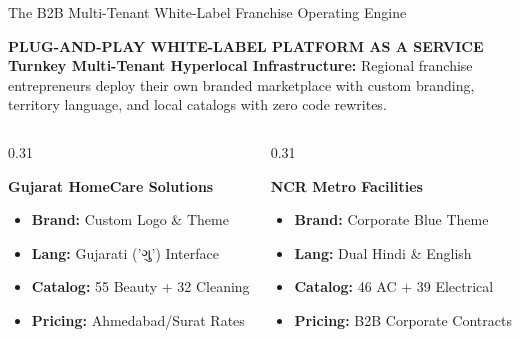 \documentclass[aspectratio=169,11pt]{beamer}
\begin{document}
\begin{frame}{The B2B Multi-Tenant White-Label Franchise Operating Engine}
\begin{tcolorbox}[colback=white,colframe=SmartGold,arc=3mm]
  {\scriptsize \textbf{\color{SmartGold}PLUG-AND-PLAY WHITE-LABEL PLATFORM AS A SERVICE}}\\[0.1cm]
  {\small \textbf{\color{SmartGreen}Turnkey Multi-Tenant Hyperlocal Infrastructure:}}
  {\scriptsize Regional franchise entrepreneurs deploy their own branded marketplace with custom branding, territory language, and local catalogs with zero code rewrites.}
\end{tcolorbox}
\vspace{0.2cm}
\begin{columns}[T]
  \begin{column}{0.31\textwidth}
    \begin{tcolorbox}[colback=white,colframe=SmartGreen,arc=3mm,title=\textbf{\tiny FRANCHISE A: GUJARAT CLUSTER}]
      {\tiny \textbf{Gujarat HomeCare Solutions}}
      \begin{itemize}\setlength\itemsep{0.15em}
        \item \textbf{\tiny Brand:} Custom Logo \& Theme
        \item \textbf{\tiny Lang:} Gujarati ('ગુ') Interface
        \item \textbf{\tiny Catalog:} 55 Beauty + 32 Cleaning
        \item \textbf{\tiny Pricing:} Ahmedabad/Surat Rates
      \end{itemize}
    \end{tcolorbox}
  \end{column}
  \begin{column}{0.31\textwidth}
    \begin{tcolorbox}[colback=white,colframe=SmartBlue,arc=3mm,title=\textbf{\tiny FRANCHISE B: DELHI NCR FACILITIES}]
      {\tiny \textbf{NCR Metro Facilities}}
      \begin{itemize}\setlength\itemsep{0.15em}
        \item \textbf{\tiny Brand:} Corporate Blue Theme
        \item \textbf{\tiny Lang:} Dual Hindi \& English
        \item \textbf{\tiny Catalog:} 46 AC + 39 Electrical
        \item \textbf{\tiny Pricing:} B2B Corporate Contracts
      \end{itemize}
    \end{tcolorbox}

\end{column}
\end{columns}
\end{frame}
\end{document}
